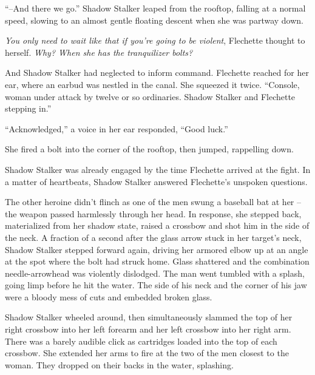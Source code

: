 ``--And there we go.''  Shadow Stalker leaped from the rooftop, falling at a normal speed, slowing to an almost gentle floating descent when she was partway down.



\emph{You only need to wait like that if you're going to be violent}, Flechette thought to herself.  \emph{Why?  When she has the tranquilizer bolts?}



And Shadow Stalker had neglected to inform command.  Flechette reached for her ear, where an earbud was nestled in the canal. She squeezed it twice.  ``Console, woman under attack by twelve or so ordinaries.  Shadow Stalker and Flechette stepping in.''



``Acknowledged,'' a voice in her ear responded, ``Good luck.''



She fired a bolt into the corner of the rooftop, then jumped, rappelling down.



Shadow Stalker was already engaged by the time Flechette arrived at the fight.  In a matter of heartbeats, Shadow Stalker answered Flechette's unspoken questions.



The other heroine didn't flinch as one of the men swung a baseball bat at her – the weapon passed harmlessly through her head.  In response, she stepped back, materialized from her shadow state, raised a crossbow and shot him in the side of the neck.  A fraction of a second after the glass arrow stuck in her target's neck, Shadow Stalker stepped forward again, driving her armored elbow up at an angle at the spot where the bolt had struck home.  Glass shattered and the combination needle-arrowhead was violently dislodged.  The man went tumbled with a splash, going limp before he hit the water.  The side of his neck and the corner of his jaw were a bloody mess of cuts and embedded broken glass.



Shadow Stalker wheeled around, then simultaneously slammed the top of her right crossbow into her left forearm and her left crossbow into her right arm.  There was a barely audible click as cartridges loaded into the top of each crossbow.  She extended her arms to fire at the two of the men closest to the woman.  They dropped on their backs in the water, splashing.



